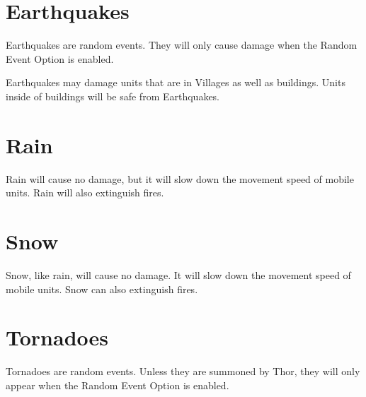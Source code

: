 \section{Earthquakes}


Earthquakes are random events. They will only cause damage when the Random Event Option is enabled.

Earthquakes may damage units that are in Villages as well as buildings. Units inside of buildings will be safe from Earthquakes.

\section{Rain}


Rain will cause no damage, but it will slow down the movement speed of mobile units. Rain will also extinguish fires.

\section{Snow}


Snow, like rain, will cause no damage. It will slow down the movement speed of mobile units. Snow can also extinguish fires.

\section{Tornadoes}


Tornadoes are random events. Unless they are summoned by Thor, they will only appear when the Random Event Option is enabled.